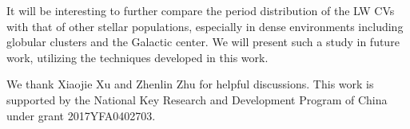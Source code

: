 \documentclass[fleqn,usenatbib]{mnras}
\begin{document}
It will be interesting to further compare the period distribution of the LW CVs with that of other stellar populations, especially in dense environments including globular clusters and the Galactic center. We will present such a study in future work, utilizing the techniques developed in this work.

\vskip0.5cm
We thank Xiaojie Xu and Zhenlin Zhu for helpful discussions. This work is supported by the National Key Research and Development Program of China under grant 2017YFA0402703.



{}

\appendix
\end{document}
